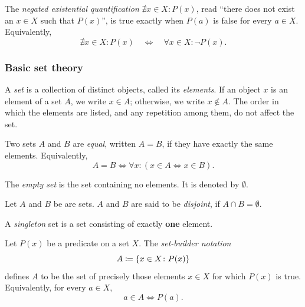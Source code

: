 \documentclass[11pt,a4paper]{amsart}
\begin{document}
\begin{definition}
  The \emph{negated existential quantification}
  \(\nexists x \in X \colon P(x)\), read ``there does not exist an \(x \in X\)
  such that \(P(x)\)'', is true exactly when \(P(a)\) is false for every
  \(a \in X\). Equivalently,
  \[
    \nexists x \in X \colon P(x)
    \quad \iff \quad
    \forall x \in X \colon \neg P(x).
  \]
\end{definition}

\subsubsection{Basic set theory}

\begin{definition}
  A \emph{set} is a collection of distinct objects, called its
  \emph{elements}. If an object \(x\) is an element of a set \(A\), we write
  \(x \in A\); otherwise, we write \(x \notin A\). The order in which the
  elements are listed, and any repetition among them, do not affect the set.
\end{definition}

\begin{definition}
  Two sets \(A\) and \(B\) are \emph{equal}, written \(A = B\), if they have
  exactly the same elements. Equivalently,
  \[
    A = B \iff \forall x \colon (x \in A \iff x \in B).
  \]
\end{definition}

\begin{definition}
  The \emph{empty set} is the set containing no elements. It is denoted by
  \(\emptyset\).
\end{definition}

\begin{definition}
  Let \(A\) and \(B\) be are sets. \(A\) and \(B\) are said to be
  \emph{disjoint}, if \(A \cap B = \emptyset\).
\end{definition}

\begin{definition}
  A \emph{singleton} set is a set consisting of exactly \textbf{one} element.
\end{definition}

\begin{definition}
  Let \(P(x)\) be a predicate on a set \(X\). The \emph{set-builder notation}
  \[
    A \coloneqq \left\lbrace x \in X \colon P(x)\right\rbrace
  \]
  defines \(A\) to be the set of precisely those elements \(x \in X\) for which
  \(P(x)\) is true. Equivalently, for every \(a \in X\),
  \[
    a \in A \iff P(a).
  \]
\end{definition}
\end{document}
